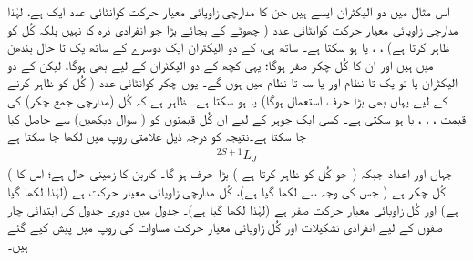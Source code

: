  اس مثال میں دو الیکٹران ایسے ہیں جن کا مدارچی زاویائی معیار حرکت کوانٹائی عدد ایک  ہے، لہٰذا مدارچی زاویائی معیار حرکت کوانٹائی عدد  ( چھوٹے  کے بجائے بڑا  جو انفرادی ذرہ کا نہیں بلکہ کُل کو ظاہر کرتا ہے) ، ، یا  ہو سکتا ہے۔ ساتھ ہی،  کے دو الیکٹران ایک دوسرے کے ساتھ یک تا حال بندھن میں ہیں اور ان کا کُل چکر صفر ہوگا؛ یہی کچھ  کے دو الیکٹران کے لیے بھی ہوگا، لیکن  کے دو الیکٹران یا تو یک تا نظام اور یا سہ تا نظام میں ہوں گے۔ یوں چکر کوانٹائی عدد ( کُل کو ظاہر کرنے کے لیے یہاں بھی بڑا حرف استعمال ہوگا)  یا  ہو سکتا ہے۔ ظاہر ہے کہ  کُل (مدارچی جمع چکر)  کی قیمت ، ، ، یا  ہو سکتی ہے۔ کسی ایک جوہر کے لیے ان کُل قیمتوں کو  ( سوال  دیکھیں) سے حاصل کیا جا سکتا ہے۔نتیجہ کو درجہ ذیل علامتی روپ میں لکھا جا سکتا ہے
 \begin{align}\label{مساوات_متماثل_علامتی_لکھائی}
 ^{2S+1}L_{J}
 \end{align}
( جہاں  اور  اعداد جبکہ  ( جو کُل کو ظاہر کرتا ہے ) بڑا حرف ہو گا۔ کاربن کا زمینی حال  ہے؛ اس کا کُل چکر  ہے ( جس کی وجہ سے   لکھا گیا ہے)، کُل مدارچی زاویائی معیار حرکت  ہے (لہٰذا  لکھا گیا ہے) اور  کُل زاویائی معیار حرکت صفر ہے (لہٰذا  لکھا گیا ہے)۔ جدول  میں دوری جدول کی ابتدائی چار صفوں کے لیے انفرادی تشکیلات اور کُل زاویائی معیار حرکت مساوات  کی روپ میں پیش کیے گئے ہیں۔ 

